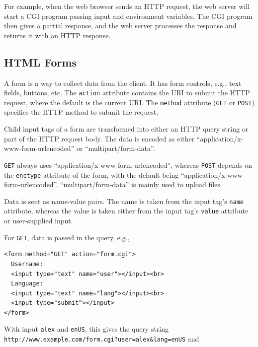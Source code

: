 For example, when the web browser sends an HTTP request, the web server will start a CGI program passing input and environment variables. The CGI program then gives a partial response, and the web server processes the response and returns it with an HTTP response. 

\subsection{HTML Forms}
A form is a way to collect data from the client. It has form controls, e.g., text fields, buttons, etc. The \texttt{action} attribute contains the URI to submit the HTTP request, where the default is the current URI. The \texttt{method} attribute (\texttt{GET} or \texttt{POST}) specifies the HTTP method to submit the request. 

Child input tags of a form are transformed into either an HTTP query string or part of the HTTP request body. The data is encoded as either ``application/x-www-form-urlencoded'' or ``multipart/form-data''.

\texttt{GET} always uses ``application/x-www-form-urlencoded'', whereas \texttt{POST} depends on the \texttt{enctype} attribute of the form, with the default being ``application/x-www-form-urlencoded''. ``multipart/form-data'' is mainly used to upload files. 

Data is sent as name-value pairs. The name is taken from the input tag's \texttt{name} attribute, whereas the value is taken either from the input tag's \texttt{value} attribute or user-supplied input. 

For \texttt{GET}, data is passed in the query, e.g., 

\begin{verbatim}
<form method="GET" action="form.cgi">
  Username:
  <input type="text" name="user"></input><br>
  Language:
  <input type="text" name="lang"></input><br>
  <input type="submit"></input>
</form>
\end{verbatim}

With input \texttt{alex} and \texttt{enUS}, this gives the query string \texttt{http://www.example.com/form.cgi?user=alex\&lang=enUS} and 

